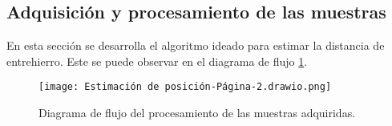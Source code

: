\subsection{Adquisición y procesamiento de las muestras} \label{sec_adquisicion_y_procesamiento}

En esta sección se desarrolla el algoritmo ideado para estimar la distancia de entrehierro. Este se puede observar en el diagrama de flujo \ref{fig:procesamiento-muestras-adquiridas}.


\begin{figure}[H]
	\centering
	\texttt{[image: Estimación de posición-Página-2.drawio.png]}
	\caption{ Diagrama de flujo del procesamiento de las muestras adquiridas.}
	\label{fig:procesamiento-muestras-adquiridas}
\end{figure}

